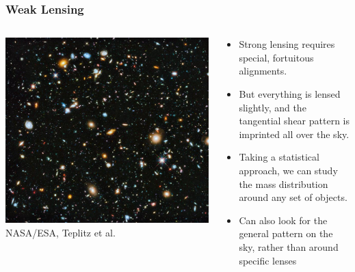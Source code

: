 \documentclass{beamer}
\begin{document}
\frame
{
    \frametitle{Weak Lensing}

    \begin{columns}

        \begin{column}{0.5\textwidth}
            \begin{center}
                \includegraphics[width=\textwidth]{hubble-ultra-deep-scaled.jpg}
                \newline
                {\tiny  NASA/ESA, Teplitz et al.}
            \end{center}
        \end{column}

        \begin{column}{0.5\textwidth}    
            \begin{itemize}

                \item Strong lensing requires special, fortuitous alignments.

                \item But everything is lensed slightly, and the {\color{gold} tangential shear}
                    pattern is imprinted all over the sky.

                \item Taking a statistical approach, we can study the mass
                    distribution around any set of objects.

                \item Can also look for the general pattern on the sky, rather
                    than around specific lenses

            \end{itemize}
        \end{column}

    \end{columns}
}
\end{document}
